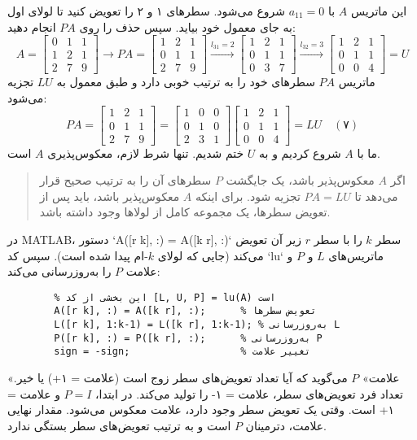 \documentclass[12pt, a4paper]{book}
\begin{document}
	این ماتریس $A$ با $a_{11}=0$ شروع می‌شود. سطرهای ۱ و ۲ را تعویض کنید تا لولای اول به جای معمول خود بیاید. سپس حذف را روی $PA$ انجام دهید:
	\[ A = \begin{bmatrix} 0 & 1 & 1 \\ 1 & 2 & 1 \\ 2 & 7 & 9 \end{bmatrix} \to PA = \begin{bmatrix} 1 & 2 & 1 \\ 0 & 1 & 1 \\ 2 & 7 & 9 \end{bmatrix} \xrightarrow{l_{31}=2} \begin{bmatrix} 1 & 2 & 1 \\ 0 & 1 & 1 \\ 0 & 3 & 7 \end{bmatrix} \xrightarrow{l_{32}=3} \begin{bmatrix} 1 & 2 & 1 \\ 0 & 1 & 1 \\ 0 & 0 & 4 \end{bmatrix} = U \]
	ماتریس $PA$ سطرهای خود را به ترتیب خوبی دارد و طبق معمول به $LU$ تجزیه می‌شود:
	\[ PA = \begin{bmatrix} 1 & 2 & 1 \\ 0 & 1 & 1 \\ 2 & 7 & 9 \end{bmatrix} = \begin{bmatrix} 1 & 0 & 0 \\ 0 & 1 & 0 \\ 2 & 3 & 1 \end{bmatrix} \begin{bmatrix} 1 & 2 & 1 \\ 0 & 1 & 1 \\ 0 & 0 & 4 \end{bmatrix} = LU \quad (۷) \]
	ما با $A$ شروع کردیم و به $U$ ختم شدیم. تنها شرط لازم، معکوس‌پذیری $A$ است.
	\begin{quote}
		اگر $A$ معکوس‌پذیر باشد، یک جایگشت $P$ سطرهای آن را به ترتیب صحیح قرار می‌دهد تا $PA=LU$ تجزیه شود. برای اینکه $A$ معکوس‌پذیر باشد، باید پس از تعویض سطرها، یک مجموعه کامل از لولاها وجود داشته باشد.
	\end{quote}
	در MATLAB، دستور `A([r k], :) = A([k r], :)` سطر $k$ را با سطر $r$ زیر آن تعویض می‌کند (جایی که لولای $k$-ام پیدا شده است). سپس کد `lu` ماتریس‌های $L$ و $P$ و علامت $P$ را به‌روزرسانی می‌کند:
	\begin{verbatim}
		% این بخشی از کد [L, U, P] = lu(A) است
		A([r k], :) = A([k r], :);      % تعویض سطرها
		L([r k], 1:k-1) = L([k r], 1:k-1); % به‌روزرسانی L
		P([r k], :) = P([k r], :);      % به‌روزرسانی P
		sign = -sign;                   % تغییر علامت
	\end{verbatim}
	«علامت» $P$ می‌گوید که آیا تعداد تعویض‌های سطر زوج است (علامت = ۱+) یا خیر. تعداد فرد تعویض‌های سطر، علامت = ۱- را تولید می‌کند. در ابتدا، $P=I$ و علامت = ۱+ است. وقتی یک تعویض سطر وجود دارد، علامت معکوس می‌شود. مقدار نهایی علامت، دترمینان $P$ است و به ترتیب تعویض‌های سطر بستگی ندارد.
	
\end{document}
